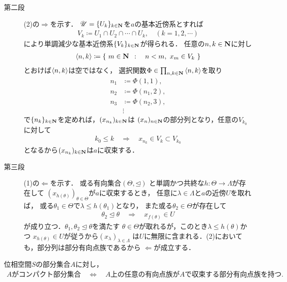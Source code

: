\begin{prf}
\begin{description}
			\item[第二段] (2)の$\Longrightarrow$を示す．
				$\mathscr{U} = \{U_k\}_{k \in \mathbf{N}}$を$a$の基本近傍系とすれば
				\begin{align}
					V_k \coloneqq U_1 \cap U_2 \cap \cdots \cap U_k,
					\quad (k=1,2,\cdots)
				\end{align}
				により単調減少な基本近傍系$\{V_k\}_{k \in \mathbf{N}}$が得られる．
				任意の$n,k \in \mathbf{N}$に対し
				\begin{align}
					\inprod<n,k> \coloneqq
					\Set{m \in \N}{n < m,\ x_m \in V_k}
				\end{align}
				とおけば$\inprod<n,k>$は空ではなく，
				選択関数$\Phi \in \prod_{n,k \in \N} \inprod<n,k>$を取り
				\begin{align}
					n_1 &\coloneqq \Phi(1,1), \\
					n_2 &\coloneqq \Phi(n_1,2), \\
					n_3 &\coloneqq \Phi(n_2,3), \\
					&\vdots
				\end{align}
				で$\{n_k\}_{k \in \mathbf{N}}$を定めれば，$(x_{n_k})_{k \in \mathbf{N}}$は
				$(x_n)_{n \in \mathbf{N}}$の部分列となり，任意の$V_{k_0}$に対して
				\begin{align}
					k_0 \leq k \quad \Longrightarrow \quad
					x_{n_k} \in V_k \subset V_{k_0}
				\end{align}
				となるから$(x_{n_k})_{k \in \mathbf{N}}$は$a$に収束する．
		
			\item[第三段] (1)の$\Longleftarrow$を示す．
				或る有向集合$(\Theta,\unlhd)$
				と単調かつ共終な$h:\Theta \longrightarrow \Lambda$が存在して
				$(x_{h(\theta)})_{\theta \in \Theta}$が$a$に収束するとき，
				任意に$\lambda \in \Lambda$と$a$の近傍$U$を取れば，
				或る$\theta_1 \in \Theta$で$\lambda \leq h(\theta_1)$となり，
				また或る$\theta_2 \in \Theta$が存在して
				\begin{align}
					\theta_2 \unlhd \theta \quad \Longrightarrow \quad
					x_{f(\theta)} \in U
				\end{align}
				が成り立つ．$\theta_1,\theta_2 \unlhd \theta$を満たす
				$\theta \in \Theta$が取れるが，このとき$\lambda \leq h(\theta)$かつ
				$x_{h(\theta)} \in U$が従うから$(x_\lambda)_{\lambda \in \Lambda}$
				は$U$に無限に含まれる．(2)においても，部分列は部分有向点族であるから
				$\Longleftarrow$が成立する．
				\QED
		\end{description}
	\end{prf}
	
	\begin{screen}
		\begin{thm}
			位相空間$S$の部分集合$A$に対し，
			\begin{align}
				\mbox{$A$がコンパクト部分集合}
				\quad \Longleftrightarrow \quad
				\mbox{$A$上の任意の有向点族が$A$で収束する部分有向点族を持つ}.
			\end{align}
		\end{thm}
	\end{screen}
	
